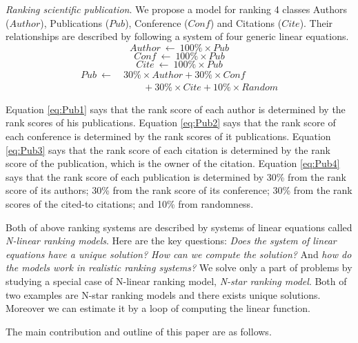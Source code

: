 \documentclass[10pt,leqno,twoside]{article}
\begin{document}
\textit{Ranking scientific publication}. We propose a model for ranking 4 classes Authors ($Author$), Publications ($Pub$), Conference ($Conf$) and Citations ($Cite$). Their relationships are described by following a system of four generic linear equations.
{\small
\begin{equation}\label{eq:Pub1}
Author ~\longleftarrow~ 100\% \times Pub
\end{equation}
\begin{equation}\label{eq:Pub2}
Conf ~\longleftarrow~ 100\% \times Pub
\end{equation}
\begin{equation}\label{eq:Pub3}
Cite ~\longleftarrow~ 100\% \times Pub
\end{equation}
\begin{equation}\label{eq:Pub4}
\begin{split}
Pub ~\longleftarrow~ &30\% \times Author +  30\% \times Conf\\
&\qquad +  30\% \times Cite+  10\% \times Random
\end{split}
\end{equation}
}

Equation \ref{eq:Pub1} says that the rank score of each author is determined by the rank scores of his publications. Equation \ref{eq:Pub2} says that the rank score of each conference is determined by the rank scores of it publications. Equation \ref{eq:Pub3} says that the rank score of each citation is determined by the rank score of the publication, which is the owner of the citation. Equation \ref{eq:Pub4} says that the rank score of each publication is determined by 30\% from the rank score of its authors; 30\% from the rank score of its conference; 30\% from the rank scores of the cited-to citations; and 10\% from randomness.

Both of above ranking systems are described by systems of linear equations called \textit{N-linear ranking models}. Here are the key questions: \textit{Does the system of linear equations have a unique solution? How can we compute the solution?} And \textit{how do the models work in realistic ranking systems?} We solve only a part of problems by studying a special case of N-linear ranking model, \textit{N-star ranking model}. Both of two examples are N-star ranking models  and there exists unique solutions. Moreover we can estimate it by a loop of computing the linear function.


The main contribution and outline of this paper are as follows.
\end{document}
